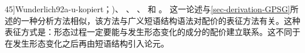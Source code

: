   45]{Wunderlich92a-u-kopiert}；\citeyear[--126]{Wunderlich97c})、 、 、 和 。
    这一论述与\ref{sec-derivation-GPSG}所述的一种分析方法相似，该方法与广义短语结构语法对配价的表征方法有关。这种表征方式是：形态过程一定要能与发生形态变化的成分的配价建立联系。这不同于在发生形态变化之后再由短语结构引入论元。

